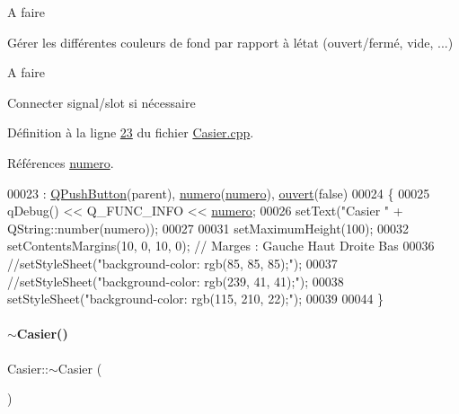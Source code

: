 \begin{DoxyRefDesc}{A faire}
\item[\hyperlink{todo__todo000002}{A faire}]Gérer les différentes couleurs de fond par rapport à l\textquotesingle{}état (ouvert/fermé, vide, ...) \end{DoxyRefDesc}


\begin{DoxyRefDesc}{A faire}
\item[\hyperlink{todo__todo000003}{A faire}]Connecter signal/slot si nécessaire \end{DoxyRefDesc}


Définition à la ligne \hyperlink{_casier_8cpp_source_l00023}{23} du fichier \hyperlink{_casier_8cpp_source}{Casier.\+cpp}.



Références \hyperlink{_casier_8h_source_l00044}{numero}.


\begin{DoxyCode}
00023                                           : \hyperlink{class_q_push_button}{QPushButton}(parent), 
      \hyperlink{class_casier_a17aa23e73b177559266a9fb17f63b812}{numero}(\hyperlink{class_casier_a17aa23e73b177559266a9fb17f63b812}{numero}), \hyperlink{class_casier_afe544ed1a87ce714a9fbbe16126669e4}{ouvert}(\textcolor{keyword}{false})
00024 \{
00025     qDebug() << Q\_FUNC\_INFO << \hyperlink{class_casier_a17aa23e73b177559266a9fb17f63b812}{numero};
00026     setText(\textcolor{stringliteral}{"Casier "} + QString::number(numero));
00027 
00031     setMaximumHeight(100);
00032     setContentsMargins(10, 0, 10, 0); \textcolor{comment}{// Marges : Gauche Haut Droite Bas}
00036 \textcolor{comment}{}    \textcolor{comment}{//setStyleSheet("background-color: rgb(85, 85, 85);");}
00037     \textcolor{comment}{//setStyleSheet("background-color: rgb(239, 41, 41);");}
00038     setStyleSheet(\textcolor{stringliteral}{"background-color: rgb(115, 210, 22);"});
00039 
00044 \}
\end{DoxyCode}
\mbox{\label{class_casier_a4aebc2219ccd4612cf79413904bb9340}} 
\paragraph{\texorpdfstring{$\sim$\+Casier()}{~Casier()}}
{\footnotesize\ttfamily Casier\+::$\sim$\+Casier (\begin{DoxyParamCaption}{ }\end{DoxyParamCaption})}



